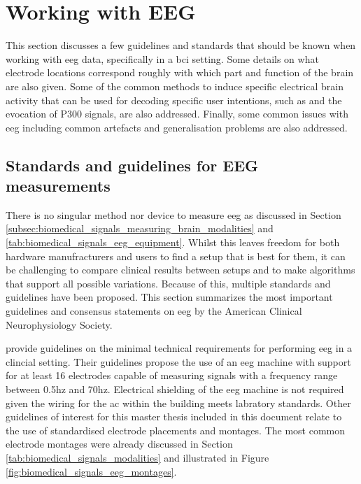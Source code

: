 

\section{Working with EEG}
\label{sec:biomedical_signals_working_with_eeg}

This section discusses a few guidelines and standards that should be known when working with \gls{eeg} data, specifically in a \gls{bci} setting.
Some details on what electrode locations correspond roughly with which part and function of the brain are also given.
Some of the common methods to induce specific electrical brain activity that can be used for decoding specific user intentions, such as  and the evocation of P300 signals, are also addressed.
Finally, some common issues with \gls{eeg} including common artefacts and generalisation problems are also addressed.


\subsection{Standards and guidelines for EEG measurements}
\label{subsec:biomedical_signals_working_with_eeg_standards}

There is no singular method nor device to measure \gls{eeg} as discussed in Section \ref{subsec:biomedical_signals_measuring_brain_modalities} and \ref{tab:biomedical_signals_eeg_equipment}.
Whilst this leaves freedom for both hardware manufracturers and users to find a setup that is best for them, it can be challenging to compare clinical results between setups and to make algorithms that support all possible variations.
Because of this, multiple standards and guidelines have been proposed.
This section summarizes the most important guidelines and consensus statements on \gls{eeg} by the American Clinical Neurophysiology Society.

 provide guidelines on the minimal technical requirements for performing \gls{eeg} in a clincial setting.
Their guidelines propose the use of an \gls{eeg} machine with support for at least 16 electrodes capable of measuring signals with a frequency range between 0.5\gls{hz} and 70\gls{hz}.
Electrical shielding of the \gls{eeg} machine is not required given the wiring for the \gls{ac} within the building meets labratory standards.
Other guidelines of interest for this master thesis included in this document relate to the use of standardised electrode placements and montages.
The most common electrode montages were already discussed in Section \ref{tab:biomedical_signals_modalities} and illustrated in Figure \ref{fig:biomedical_signals_eeg_montages}.

